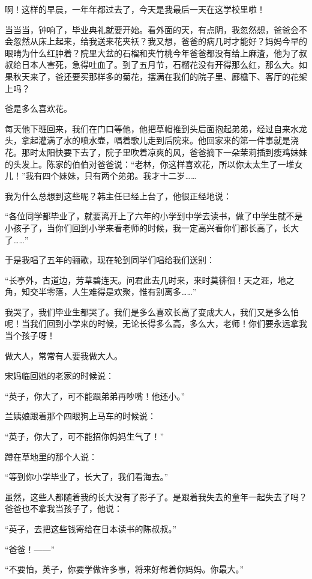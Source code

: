 \par 啊！这样的早晨，一年年都过去了，今天是我最后一天在这学校里啦！
\par 当当当，钟响了，毕业典礼就要开始。看外面的天，有点阴，我忽然想，爸爸会不会忽然从床上起来，给我送来花夹袄？我又想，爸爸的病几时才能好？妈妈今早的眼睛为什么红肿着？院里大盆的石榴和夹竹桃今年爸爸都没有给上麻渣，他为了叔叔给日本人害死，急得吐血了。到了五月节，石榴花没有开得那么红，那么大。如果秋天来了，爸还要买那样多的菊花，摆满在我们的院子里、廊檐下、客厅的花架上吗？
\par 爸是多么喜欢花。
\par 每天他下班回来，我们在门口等他，他把草帽推到头后面抱起弟弟，经过自来水龙头，拿起灌满了水的喷水壶，唱着歌儿走到后院来。他回家来的第一件事就是浇花。那时太阳快要下去了，院子里吹着凉爽的风，爸爸摘下一朵茉莉插到瘦鸡妹妹的头发上。陈家的伯伯对爸爸说：“老林，你这样喜欢花，所以你太太生了一堆女儿！”我有四个妹妹，只有两个弟弟。我才十二岁……
\par 我为什么总想到这些呢？韩主任已经上台了，他很正经地说：
\par “各位同学都毕业了，就要离开上了六年的小学到中学去读书，做了中学生就不是小孩子了，当你们回到小学来看老师的时候，我一定高兴看你们都长高了，长大了……”
\par 于是我唱了五年的骊歌，现在轮到同学们唱给我们送别：
\par “长亭外，古道边，芳草碧连天。问君此去几时来，来时莫徘徊！天之涯，地之角，知交半零落，人生难得是欢聚，惟有别离多……”
\par 我哭了，我们毕业生都哭了。我们是多么喜欢长高了变成大人，我们又是多么怕呢！当我们回到小学来的时候，无论长得多么高，多么大，老师！你们要永远拿我当个孩子呀！
\par 做大人，常常有人要我做大人。
\par 宋妈临回她的老家的时候说：
\par “英子，你大了，可不能跟弟弟再吵嘴！他还小。”
\par 兰姨娘跟着那个四眼狗上马车的时候说：
\par “英子，你大了，可不能招你妈妈生气了！”
\par 蹲在草地里的那个人说：
\par “等到你小学毕业了，长大了，我们看海去。”
\par 虽然，这些人都随着我的长大没有了影子了。是跟着我失去的童年一起失去了吗？爸爸也不拿我当孩子了，他说：
\par “英子，去把这些钱寄给在日本读书的陈叔叔。”
\par “爸爸！——”
\par “不要怕，英子，你要学做许多事，将来好帮着你妈妈。你最大。”
